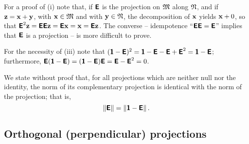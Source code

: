 {\color{OliveGreen}
\bproof
For a proof of (i) note that, if $\textsf{\textbf{E}}$  is the projection
on ${\frak M}$
along ${\frak N}$,
and if
$
{\bf z}
=
{\bf x}
+
{\bf y}
$, with
${\bf x} \in {\frak M}$
and with
${\bf y} \in {\frak N}$,
the decomposition of ${\bf x}$ yields
${\bf x}+0$, so that
$\textsf{\textbf{E}}^2{\bf z}=\textsf{\textbf{E}}\textsf{\textbf{E}}{\bf z}=\textsf{\textbf{E}}{\bf x}
={\bf x}=\textsf{\textbf{E}}{\bf z}$.
The converse --
idempotence
``$\textsf{\textbf{E}}\textsf{\textbf{E}}=\textsf{\textbf{E}}$''
implies that $\textsf{\textbf{E}}$ is a projection -- is more difficult to prove.


For the necessity of (iii) note that $(\textsf{\textbf{1}}-\textsf{\textbf{E}})^2
=\textsf{\textbf{1}}-\textsf{\textbf{E}}-\textsf{\textbf{E}}+ \textsf{\textbf{E}}^2
=\textsf{\textbf{1}}-\textsf{\textbf{E}}$;
furthermore,
$
\textsf{\textbf{E}}(\textsf{\textbf{1}}-\textsf{\textbf{E}})=
(\textsf{\textbf{1}}-\textsf{\textbf{E}})\textsf{\textbf{E}}=
\textsf{\textbf{E}}- \textsf{\textbf{E}}^2=0
$.

\eproof
}



We state without proof\cite{Szyld2006} that, for all projections
which are neither null nor the identity,
the norm of its complementary projection
is identical with the norm of the projection; that is,
\begin{equation}
\left\| \textsf{\textbf{E}} \right\| = \left\| \textsf{\textbf{1}} - \textsf{\textbf{E}} \right\|
.
\end{equation}








\subsection{Orthogonal (perpendicular) projections}

